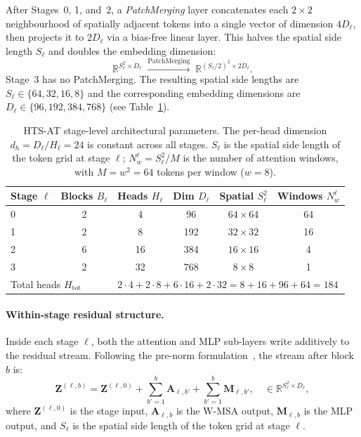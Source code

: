 After Stages~0, 1, and~2, a \emph{PatchMerging} layer concatenates each
$2\times2$ neighbourhood of spatially adjacent tokens into a single vector of
dimension $4D_\ell$, then projects it to $2D_\ell$ via a bias-free linear
layer. This halves the spatial side length $S_\ell$ and doubles the
embedding dimension:
\begin{equation}
    \mathbb{R}^{S_\ell^2 \times D_\ell}
    \;\xrightarrow{\mathrm{PatchMerging}}\;
    \mathbb{R}^{(S_\ell/2)^2 \times 2D_\ell}.
\end{equation}
Stage~3 has no PatchMerging. The resulting spatial side lengths are
$S_\ell \in \{64, 32, 16, 8\}$ and the corresponding embedding dimensions
are $D_\ell \in \{96, 192, 384, 768\}$ (see Table~\ref{tab:architecture}).

\begin{table}[h]
\centering
\setlength{\tabcolsep}{4pt}
\caption{HTS-AT stage-level architectural parameters. The per-head dimension
    $d_h = D_\ell / H_\ell = 24$ is constant across all stages. $S_\ell$
    is the spatial side length of the token grid at stage $\ell$;
    $N_w^\ell = S_\ell^2 / M$ is the number of attention windows, with
    $M = w^2 = 64$ tokens per window ($w=8$).}
\label{tab:architecture}
\begin{tabular}{lccccc}
\toprule
\textbf{Stage} $\ell$ & \textbf{Blocks} $B_\ell$ & \textbf{Heads} $H_\ell$ &
\textbf{Dim} $D_\ell$ & \textbf{Spatial} $S_\ell^2$ & \textbf{Windows} $N_w^\ell$ \\
\midrule
0 & 2 &  4 &  96 & $64\times64$ & 64 \\
1 & 2 &  8 & 192 & $32\times32$ & 16 \\
2 & 6 & 16 & 384 & $16\times16$ &  4 \\
3 & 2 & 32 & 768 & $8\times8$   &  1 \\
\midrule
\multicolumn{2}{l}{Total heads $H_{\mathrm{tot}}$}
    & \multicolumn{4}{l}{$2\!\cdot\!4 + 2\!\cdot\!8 + 6\!\cdot\!16 + 2\!\cdot\!32
      = 8+16+96+64 = 184$} \\
\bottomrule
\end{tabular}
\end{table}

\paragraph{Within-stage residual structure.}
Inside each stage $\ell$, both the attention and MLP sub-layers write
additively to the residual stream. Following the pre-norm
formulation~\cite{pre-norm}, the stream after block $b$ is:
\begin{equation}
    \mathbf{Z}^{(\ell,b)}
    = \mathbf{Z}^{(\ell,0)}
    + \sum_{b'=1}^{b} \mathbf{A}_{\ell,b'}
    + \sum_{b'=1}^{b} \mathbf{M}_{\ell,b'},
    \quad \in \mathbb{R}^{S_\ell^2 \times D_\ell},
    \label{eq:residual_stream}
\end{equation}
where $\mathbf{Z}^{(\ell,0)}$ is the stage input, $\mathbf{A}_{\ell,b}$ is
the W-MSA output, $\mathbf{M}_{\ell,b}$ is the MLP output, and $S_\ell$ is
the spatial side length of the token grid at stage $\ell$.

